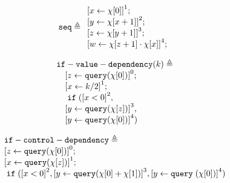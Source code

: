 \begin{example}
    \[
        \kw{seq} \triangleq 
    \begin{array}{l} 
           \clabel{ \assign{x}{\chi[0]}}^{1} ; \\
            \clabel{\assign{y}{\chi[x + 1]} }^{2} ; \\
            \clabel{\assign{z}{\chi[y + 1]}}^{3}; \\
             \clabel{\assign{w}{\chi[z + 1] \cdot \chi[x]} }^{4}  ; \\
        \end{array}
    \]
    \end{example}

    \begin{example}
        \[
        \begin{array}{l}
        \kw{if-value-dependency}(k) \triangleq \\
           \quad \clabel{ \assign{z}{\query(\chi[0])}}^{0} ; \\
           \quad \clabel{\assign{x}{k / 2} }^{1} ; \\
           \quad \eif(\clabel{x < 0}^2, \\
           \quad \clabel{\assign{y}{\query(\chi[z])}}^{3}, \\ 
           \quad \clabel{\assign{y}{\query(\chi[0])}}^{4})
            \end{array}
        \]
        \end{example}

        \begin{example}
            \[
            \begin{array}{l}
            \kw{if-control-dependency} \triangleq \\
                \clabel{ \assign{z}{\query(\chi[0])}}^{0} ; \\
                \clabel{\assign{x}{\query(\chi[z])} }^{1} ; \\
                \eif(\clabel{x < 0}^{2}, 
                \clabel{\assign{y}{\query(\chi[0] + \chi[1])}}^{3}, 
                \clabel{\assign{y}\query{(\chi[0])}}^{4})
            \end{array}
            \]
            \end{example}


